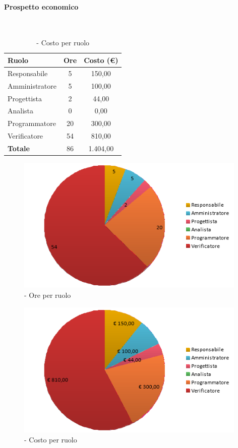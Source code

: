 \documentclass[./PianoDiProgetto.tex]{subfiles}
\begin{document}
\vspace{35 mm}
	\paragraph{Prospetto economico}\

	\begin{table}[H]
		\centering

		\begin{tabular}{l * {2}{c}}
			\toprule
			\textbf{Ruolo} & \textbf{Ore} & \textbf{Costo (\euro{})} \\
			\midrule
			Responsabile & 5 & 150,00 \\
			Amministratore  & 5 & 100,00 \\
			Progettista  & 2 & 44,00 \\
			Analista & 0 & 0,00 \\
			Programmatore  & 20 &  300,00 \\
			Verificatore  & 54 &  810,00 \\
			\midrule
			\textbf{Totale}  & 86   &  1.404,00 \\
			\bottomrule
		\end{tabular}
		\caption{\PerV{} - Costo per ruolo}
	\end{table}
\vfill

	\begin{figure}[H]
		\centering
		\includegraphics[width=11cm, trim=1cm 0cm 1cm 0cm]{grafici/V-ruolo}
			\caption{\PerV{} - Ore per ruolo}
	\end{figure}
\vfill

	\begin{figure}[H]
		\centering
		\includegraphics[width=11cm, trim=1cm 0cm 1cm 0cm]{grafici/V-costo}
			\caption{\PerV{} - Costo per ruolo}
	\end{figure}
\end{document}

